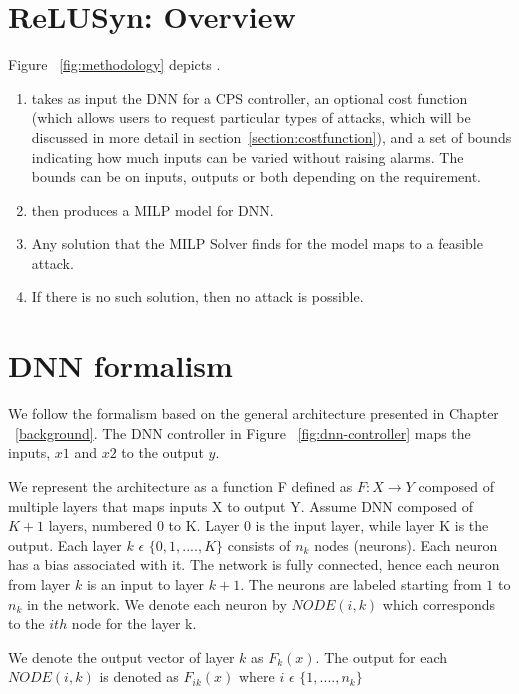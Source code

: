 \section{ReLUSyn: Overview}
Figure ~\ref{fig:methodology} depicts \tool.
\begin{enumerate}
	\item \tool takes as input the DNN for a CPS controller, an optional cost function (which allows users to request particular types of attacks, which will be discussed in more detail in section~\ref{section:costfunction}), and a set of bounds indicating how much inputs can be varied without raising alarms. The bounds can be on inputs, outputs or both depending on the requirement. 
	\item \tool then produces a \ac{MILP} model for \ac{DNN}.
	\item Any solution that the  \ac{MILP} Solver finds for the model maps to a feasible attack.
	\item If there is no such solution, then no attack is possible.
\end{enumerate}

	
\section{DNN formalism}
We follow the formalism based on the general architecture presented in Chapter ~\ref{background}. 
The \ac{DNN} controller in
 Figure ~\ref{fig:dnn-controller} maps the inputs, $x1$ and $x2$ to the output $y$. 



We represent the architecture as a function F defined as $F: X \rightarrow Y$ composed of multiple layers that maps inputs X to output Y. 
Assume \ac{DNN} composed of $K + 1$ layers, numbered 0 to K.
Layer 0 %
is the input layer, while layer K is the output.
Each layer $k$ $\epsilon$ $\{0,1,....,K\}$ consists of $n_k$ nodes (neurons).
Each neuron has a bias associated with it. 
The network is fully connected, hence each neuron from layer $k$ is an input to layer $k+1$. 
The neurons are labeled starting from $1$ to $n_k$ in the network. 
We denote each neuron by $NODE(i,k)$ which corresponds to the $ith$ node for the layer k. 

We denote the output vector of layer $k$ as $F_k(x)$.
The output for each $NODE(i,k)$ is denoted as $F_{ik}(x)$ where $i$ $\epsilon$ $\{1,....,n_k\}$ 

